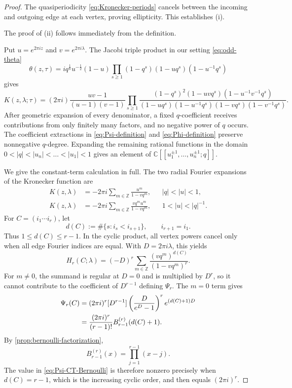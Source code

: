 \documentclass[11pt,a4paper]{amsart}
\numberwithin{equation}{section}
\theoremstyle{definition}
\theoremstyle{remark}
\newcommand{\CC}{\mathbb C}
\newcommand{\ZZ}{\mathbb Z}
\newcommand{\ii}{i}
\newcommand{\e}{e}
\begin{document}
\begin{proof}
The quasiperiodicity \eqref{eq:Kronecker-periods} cancels between the incoming and outgoing edge at each vertex, proving ellipticity.  This establishes (i).

The proof of (ii) follows immediately from the definition.

Put $u=\e^{2\pi\ii z}$ and $v=\e^{2\pi\ii\lambda}$.  The Jacobi triple product in our setting \eqref{eq:odd-theta}
\[
\theta(z,\tau)=iq^{\frac18}u^{-\frac{1}{2}}(1-u)\prod_{s\geq1}(1-q^s)(1-uq^s)(1-u^{-1}q^s)
\] 
gives
\begin{equation}
 K(z,\lambda;\tau)
 =(2\pi\ii)\frac{uv-1}{(u-1)(v-1)} \prod_{s\geq1} \frac{(1-q^s)^2(1-uvq^s)(1-u^{-1}v^{-1}q^s)} {(1-uq^s)(1-u^{-1}q^s)(1-vq^s)(1-v^{-1}q^s)}.
 \label{eq:K-product}
\end{equation}
After geometric expansion of every denominator, a fixed $q$-coefficient receives
contributions from only finitely many factors, and no negative power of $q$ occurs. The coefficient extractions in \eqref{eq:Psi-definition} and \eqref{eq:Phi-definition} preserve nonnegative $q$-degree.  Expanding the remaining rational functions in the domain $  0 < |q| < |u_n| < \dots < |u_1| < 1 $ gives an element of $\CC[[u_1^{\pm1},\ldots,u_n^{\pm1};q]]$. 

We give the constant-term calculation in full.  The two radial Fourier expansions of the Kronecker function are
\begin{align}
 K(z,\lambda)
 &=-2\pi\ii\sum_{m\in\ZZ}\frac{u^m}{1-vq^m},
 &&|q|<|u|<1,
 \label{eq:K-Fourier-inner}\\
 K(z,\lambda)
 &=-2\pi\ii\sum_{m\in\ZZ}
 \frac{vq^m u^m}{1-vq^m},
 &&1<|u|<|q|^{-1}.
 \label{eq:K-Fourier-outer}
\end{align}
For $C=(i_1\cdots i_r)$, let
\begin{equation*}
 d(C):=\#\{s:i_s<i_{s+1}\},\qquad i_{r+1}=i_1.
\end{equation*}
Thus $1\leq d(C)\leq r-1$.  In the cyclic product, all vertex powers
cancel only when all edge Fourier indices are equal.  With
$D=2\pi\ii\lambda$, this yields
\begin{equation}
 [u_{i_1}^0\cdots u_{i_r}^0] H_r(C;\lambda)
 =(-D)^r\sum_{m\in\ZZ}
 \frac{(vq^m)^{d(C)}}{(1-vq^m)^r}.
 \label{eq:CT-H}
\end{equation}
For $m\neq0$, the summand is regular at $D=0$ and is multiplied by
$D^r$, so it cannot contribute to the coefficient of $D^{r-1}$ defining
$\Psi_r$.  The $m=0$ term gives
\begin{align}
 [u_{i_1}^0\cdots u_{i_r}^0]\Psi_r(C)
 &=(2\pi\ii)^r[D^{r-1}]
 \left(\frac{D}{\e^D-1}\right)^r
 \e^{(d(C)+1)D}\notag\\
 &=\frac{(2\pi\ii)^r}{(r-1)!}
 B_{r-1}^{(r)}(d(C)+1).
 \label{eq:Psi-CT-Bernoulli}
\end{align}
By \cref{prop:bernoulli-factorization},
\begin{equation*}
 B_{r-1}^{(r)}(x)=\prod_{j=1}^{r-1}(x-j).
\end{equation*}
The value in \eqref{eq:Psi-CT-Bernoulli} is therefore nonzero precisely
when $d(C)=r-1$, which is the increasing cyclic order, and then equals
$(2\pi\ii)^r$.


\end{proof}
\end{document}
